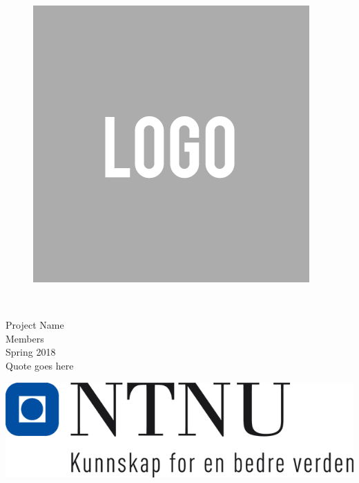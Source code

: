 \thispagestyle{empty}
\begin{figure}
    \centering
    \includegraphics[scale=0.25]{fig/Sample-Logo-square.png}
\end{figure}
\mbox{}\\[5pc]
\begin{center}
\Huge{Project Name}\\[2pc]

\small{Members} \\[3pc]

\large{Spring 2018}\\
Quote goes here\\
\end{center}
\vfill

\noindent \includegraphics[scale=0.2]{fig/NTNULOGO}
